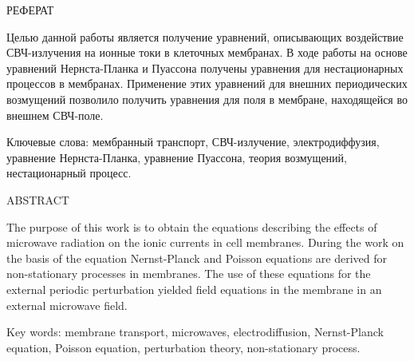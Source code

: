 \setcounter{page}{4}
\begin{center}
РЕФЕРАТ
\end{center}

Целью данной работы является получение уравнений, описывающих воздействие
СВЧ-излучения на ионные токи в клеточных мембранах. В ходе работы на основе
уравнений Нернста-Планка и Пуассона получены уравнения для нестационарных
процессов в мембранах. Применение этих уравнений для внешних периодических
возмущений позволило получить уравнения для поля в мембране, находящейся во
внешнем СВЧ-поле.
\vspace*{1cm}

\noindent Ключевые слова: мембранный транспорт, СВЧ-излучение,
электродиффузия, уравнение Нернста-Планка, уравнение Пуассона, теория
возмущений, нестационарный процесс.
\vspace*{1cm}

\begin{center}
    ABSTRACT
\end{center}

The purpose of this work is to obtain the equations describing the effects of
microwave radiation on the ionic currents in cell membranes. During the work
on the basis of the equation Nernst-Planck and Poisson equations are derived
for non-stationary processes in membranes. The use of these equations for the
external periodic perturbation yielded field equations in the membrane in an
external microwave field.
\vspace*{1cm}

\noindent Key words: membrane transport, microwaves, electrodiffusion,
Nernst-Planck equation, Poisson equation, perturbation theory,
non-stationary process.
